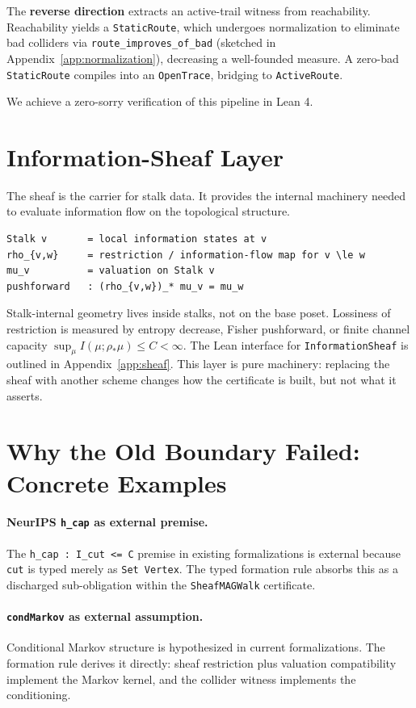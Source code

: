 \documentclass[acmsmall,screen,nonacm]{acmart}
\newcommand{\lean}[1]{\lstinline!#1!}
\begin{document}
The \textbf{reverse direction} extracts an active-trail witness from reachability. Reachability yields a \lean{StaticRoute}, which undergoes normalization to eliminate bad colliders via \lean{route_improves_of_bad} (sketched in Appendix~\ref{app:normalization}), decreasing a well-founded measure. A zero-bad \lean{StaticRoute} compiles into an \lean{OpenTrace}, bridging to \lean{ActiveRoute}.

We achieve a zero-sorry verification of this pipeline in Lean 4.

\section{Information-Sheaf Layer}\label{sec:sheaf}
The sheaf is the carrier for stalk data. It provides the internal machinery needed to evaluate information flow on the topological structure.
\begin{lstlisting}
Stalk v       = local information states at v
rho_{v,w}     = restriction / information-flow map for v \le w
mu_v          = valuation on Stalk v
pushforward   : (rho_{v,w})_* mu_v = mu_w
\end{lstlisting}
Stalk-internal geometry lives inside stalks, not on the base poset. Lossiness of restriction is measured by entropy decrease, Fisher pushforward, or finite channel capacity $\sup_\mu I(\mu ; \rho_* \mu) \le C < \infty$. The Lean interface for \lean{InformationSheaf} is outlined in Appendix~\ref{app:sheaf}. This layer is pure machinery: replacing the sheaf with another scheme changes how the certificate is built, but not what it asserts.

\section{Why the Old Boundary Failed: Concrete Examples}\label{sec:failures}

\paragraph{NeurIPS \texttt{h\_cap} as external premise.}
The \lstinline!h_cap : I_cut <= C! premise in existing formalizations is external because \lean{cut} is typed merely as \lean{Set Vertex}. The typed formation rule absorbs this as a discharged sub-obligation within the \lean{SheafMAGWalk} certificate.

\paragraph{\texttt{condMarkov} as external assumption.}
Conditional Markov structure is hypothesized in current formalizations. The formation rule derives it directly: sheaf restriction plus valuation compatibility implement the Markov kernel, and the collider witness implements the conditioning.
\end{document}

